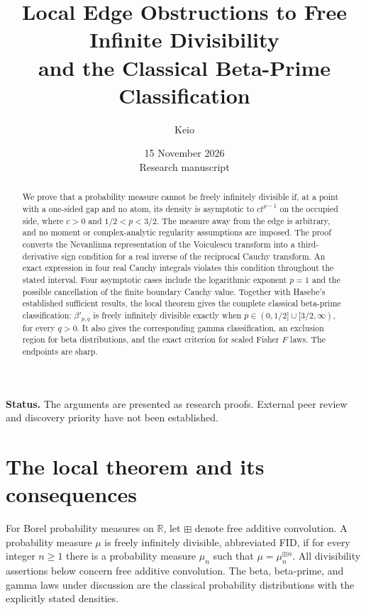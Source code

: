 \documentclass[11pt,a4paper]{article}
\title{Local Edge Obstructions to Free Infinite Divisibility\\
and the Classical Beta-Prime Classification}
\author{Keio}
\date{15 November 2026\\\small Research manuscript}
\theoremstyle{definition}
\theoremstyle{remark}
\newcommand{\R}{\mathbb R}
\begin{document}
\maketitle

\begin{abstract}
We prove that a probability measure cannot be freely infinitely
divisible if, at a point with a one-sided gap and no atom, its density
is asymptotic to $ct^{p-1}$ on the occupied side, where $c>0$ and
$1/2<p<3/2$. The measure away from the edge is arbitrary, and no
moment or complex-analytic regularity assumptions are imposed.
The proof converts the Nevanlinna representation of the Voiculescu
transform into a third-derivative sign condition for a real inverse
of the reciprocal Cauchy transform. An exact expression in four
real Cauchy integrals violates this condition throughout the stated
interval. Four asymptotic cases include the logarithmic exponent
$p=1$ and the possible cancellation of the finite boundary Cauchy
value. Together with Hasebe's established sufficient results, the
local theorem gives the complete classical beta-prime classification:
$\beta'_{p,q}$ is freely infinitely divisible exactly when
$p\in(0,1/2]\cup[3/2,\infty)$, for every $q>0$.
It also gives the corresponding gamma classification, an exclusion
region for beta distributions, and the exact criterion for scaled
Fisher $F$ laws. The endpoints are sharp.
\end{abstract}

\noindent\textbf{Status.} The arguments are presented as research proofs.
External peer review and discovery priority have not been established.

\section{The local theorem and its consequences}

For Borel probability measures on $\R$, let $\boxplus$ denote free
additive convolution. A probability measure $\mu$ is freely infinitely
divisible, abbreviated FID, if for every integer $n\ge1$ there is a
probability measure $\mu_n$ such that $\mu=\mu_n^{\boxplus n}$.
All divisibility assertions below concern free additive convolution.
The beta, beta-prime, and gamma laws under discussion are the
classical probability distributions with the explicitly stated
densities.
\end{document}
